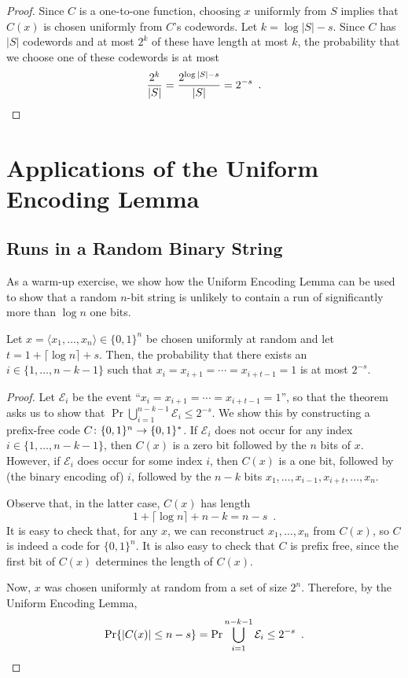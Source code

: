 \documentclass[lotsofwhite]{patmorin}
\begin{document}
\begin{proof}
  Since $C$ is a one-to-one function, choosing $x$ uniformly from $S$
  implies that $C(x)$ is chosen uniformly from $C$'s codewords. Let
  $k=\log|S|-s$. Since $C$ has $|S|$ codewords and at most $2^{k}$ of these
  have length at most $k$, the probability that we choose one of these 
  codewords is at most
  \[   \frac{2^k}{|S|} = \frac{2^{\log|S|-s}}{|S|} = 2^{-s} \enspace . \qedhere \]
\end{proof}

\section{Applications of the Uniform Encoding Lemma}


\subsection{Runs in a Random Binary String}

As a warm-up exercise, we show how the Uniform Encoding Lemma can be
used to show that a random $n$-bit string is unlikely to contain a run
of significantly more than $\log n$ one bits.

\begin{thm}
  Let $x=\langle x_1,\ldots,x_n\rangle\in\{0,1\}^n$ be chosen
  uniformly at random and let $t=1+\lceil\log n\rceil + s$. Then, the
  probability that there exists an $i\in\{1,\ldots,n-k-1\}$ such that
  $x_i=x_{i+1}=\cdots=x_{i+t-1}=1$ is at most $2^{-s}$.
\end{thm}

\begin{proof}
  Let $\mathcal{E}_i$ be the event ``$x_i=x_{i+1}=\cdots=x_{i+t-1}=1$'',
  so that the theorem asks us to show that $\Pr \bigcup_{i=1}^{n-k-1}
  \mathcal{E}_i \le 2^{-s}$.  We show this by constructing a prefix-free
  code $C\colon\{0,1\}^n\to\{0,1\}^*$.  If $\mathcal{E}_i$ does not
  occur for any index $i\in\{1,\ldots,n-k-1\}$, then $C(x)$ is a zero
  bit followed by the $n$ bits of $x$.  However, if $\mathcal{E}_i$
  does occur for some index $i$, then $C(x)$ is a one bit, followed
  by (the binary encoding of) $i$, followed by the $n-k$ bits
  $x_1,\ldots,x_{i-1},x_{i+t},\ldots,x_n$.

  Observe that, in the latter case, $C(x)$ has length 
  \[
      1 + \lceil\log n\rceil + n - k = n-s \enspace .
  \]
  It is easy to check that, for any $x$, we can reconstruct
  $x_1,\ldots,x_n$ from $C(x)$, so $C$ is indeed a code for $\{0,1\}^n$.
  It is also easy to check that $C$ is prefix free, since the first bit
  of $C(x)$ determines the length of $C(x)$.

  Now, $x$ was chosen uniformly at random from a set of size $2^{n}$.
  Therefore, by the Uniform Encoding Lemma, 
  \[
      \Pr\{|C(x)|\le n-s\} = \Pr \bigcup_{i=1}^{n-k-1} \mathcal{E}_i \le 2^{-s} \enspace . \qedhere \]
\end{proof}
\end{document}

